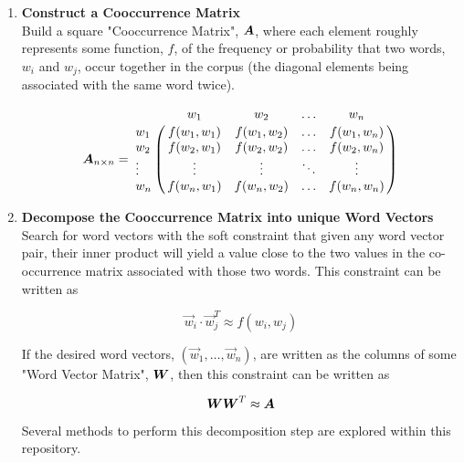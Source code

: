 \documentclass{article}
\begin{document}
\begin{enumerate}
	\item 
		\textbf{Construct a Cooccurrence Matrix}\\
		Build a square "Cooccurrence Matrix", $\boldsymbol{A}$, where each element roughly represents some function, $f$, of the frequency or probability that two words, $w_i$ and $w_j$, occur together in the corpus (the diagonal elements being associated with the same word twice).
		
		\begin{equation*}
		\mat{A}{n}{n}=
		\bordermatrix{	&	w_1			&	w_2			& \ldots &	w_n			\cr
                w_1 	& f(w_1,w_1) 	&  f(w_1,w_2)   & \ldots & f(w_1,w_n) 	\cr
                w_2 	& f(w_2,w_1) 	&  f(w_2,w_2) 	& \ldots & f(w_2,w_n) 	\cr
                \vdots	& \vdots 		& \vdots 		& \ddots & \vdots		\cr
                w_n		& f(w_n,w_1)  	&  f(w_n,w_2)   & \ldots & f(w_n,w_n) 	}
		\end{equation*}
	\item 
		\textbf{Decompose the Cooccurrence Matrix into unique Word Vectors}\\
		Search for word vectors with the soft constraint that given any word vector pair, their inner product will yield a value close to the two values in the co-occurrence matrix associated with those two words. This constraint can be written as
		
		\begin{equation*}
			\vec{w}_{i} \cdot \vec{w}_{j}^T \approx f(w_i,w_j)
		\end{equation*}
		
		If the desired word vectors, $\left( \vec{w}_{1}, \ldots, \vec{w}_{n} \right)$, are written as the columns of some "Word Vector Matrix", $\boldsymbol{W}$, then this constraint can be written as
		
		\begin{equation*}
			\boldsymbol{W}\boldsymbol{W}^T \approx \boldsymbol{A}
		\end{equation*}
		
		Several methods to perform this decomposition step are explored within this repository. 
\end{enumerate}

%
%
\end{document}
